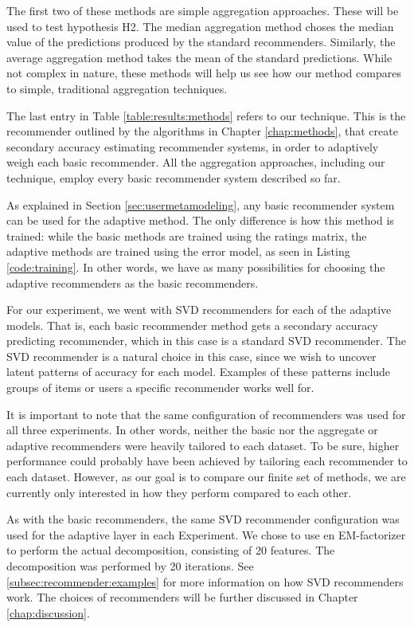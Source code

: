 The first two of these methods are simple aggregation approaches.
These will be used to test hypothesis H2.
The median aggregation method choses the median value of the predictions
produced by the standard recommenders.
Similarly, the average aggregation method takes the mean of the
standard predictions.
While not complex in nature, these methods
will help us see how our method compares to simple, traditional
aggregation techniques.

The last entry in Table \ref{table:results:methods}
refers to our technique. 
This is the recommender outlined by the algorithms
in Chapter \ref{chap:methods},
that create secondary accuracy estimating recommender systems,
in order to adaptively weigh each basic recommender.
All the aggregation approaches, including our technique,
employ every basic recommender system described so far.

As explained in Section \ref{sec:usermetamodeling},
any basic recommender system can be used for the adaptive method.
The only difference is how this method is trained:
while the basic methods are trained using the ratings matrix,
the adaptive methods are trained using the error model,
as seen in Listing \ref{code:training}.
In other words, we have as many possibilities for choosing
the adaptive recommenders as the basic recommenders.

For our experiment, we went with SVD recommenders
for each of the adaptive models.
That is, each basic recommender method gets a secondary 
accuracy predicting recommender, which in this case is a 
standard SVD recommender.
The SVD recommender is a natural choice in this case,
since we wish to uncover latent patterns of accuracy
for each model.
Examples of these patterns include groups of items
or users a specific recommender works well for.

It is important to note that the same configuration of recommenders was used for all three experiments.
In other words, neither the basic nor the aggregate or adaptive recommenders were heavily tailored
to each dataset. To be sure, higher performance could probably have been achieved
by tailoring each recommender to each dataset. 
However, as our goal is to compare our finite set of methods, 
we are currently only interested in how they perform compared to each other.

As with the basic recommenders, the same SVD recommender configuration was used 
for the adaptive layer in each Experiment.
We chose to use en EM-factorizer to perform the actual decomposition,
consisting of 20 features. The decomposition was performed by 20 iterations.
See \ref{subsec:recommender:examples} for more information on how SVD recommenders work. 
The choices of recommenders will be further discussed
in Chapter \ref{chap:discussion}.

